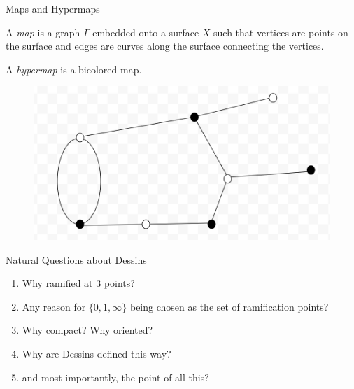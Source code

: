 \documentclass{beamer}
\begin{document}
\begin{frame}{Maps and Hypermaps}
    \begin{definition}[Map]
        A \emph{map} is a graph $\Gamma$ embedded onto a surface $X$ such that vertices are points on the surface and edges are curves along the surface connecting the vertices. 
    \end{definition}
    
    \begin{definition}[Hypermap]
        A \emph{hypermap} is a bicolored map.
    \end{definition}
    
    \begin{figure}
        \centering
        \includegraphics[scale=0.4]{images_talk/example_of_hypermap.png}
    \end{figure}
\end{frame}

\begin{frame}{Natural Questions about Dessins}
    \begin{enumerate}
        \item Why ramified at 3 points?
        \item Any reason for $\{0,1,\infty\}$ being chosen as the set of ramification points?
        \item Why compact? Why oriented?
        \item Why are Dessins defined this way?
        \item and most importantly, the point of all this?
    \end{enumerate}
\end{frame}
\end{document}

